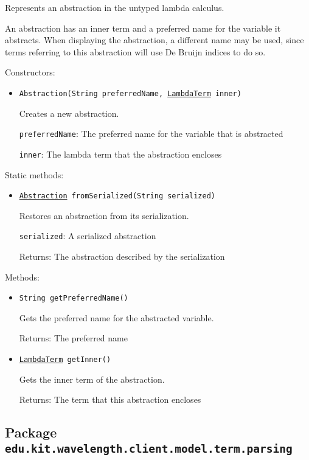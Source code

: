 Represents an abstraction in the untyped lambda calculus.
 
 An abstraction has an inner term and a preferred name for the variable it
 abstracts. When displaying the abstraction, a different name may be used,
 since terms referring to this abstraction will use De Bruijn indices to do
 so.

Constructors:
\begin{itemize}
\item \texttt{Abstraction(String preferredName, \hyperref[type:edu.kit.wavelength.client.model.term.LambdaTerm]{LambdaTerm} inner)}

Creates a new abstraction.

\texttt{preferredName}: The preferred name for the variable that is abstracted

\texttt{inner}: The lambda term that the abstraction encloses

\end{itemize}

Static methods:
\begin{itemize}
\item \texttt{\hyperref[type:edu.kit.wavelength.client.model.term.Abstraction]{Abstraction} fromSerialized(String serialized)}

Restores an abstraction from its serialization.

\texttt{serialized}: A serialized abstraction

Returns: The abstraction described by the serialization

\end{itemize}

Methods:
\begin{itemize}
\item \texttt{String getPreferredName()}

Gets the preferred name for the abstracted variable.

Returns: The preferred name

\item \texttt{\hyperref[type:edu.kit.wavelength.client.model.term.LambdaTerm]{LambdaTerm} getInner()}

Gets the inner term of the abstraction.

Returns: The term that this abstraction encloses

\end{itemize}

\subsection{Package \lstinline{edu.kit.wavelength.client.model.term.parsing}}
\label{pkg:edu.kit.wavelength.client.model.term.parsing}


